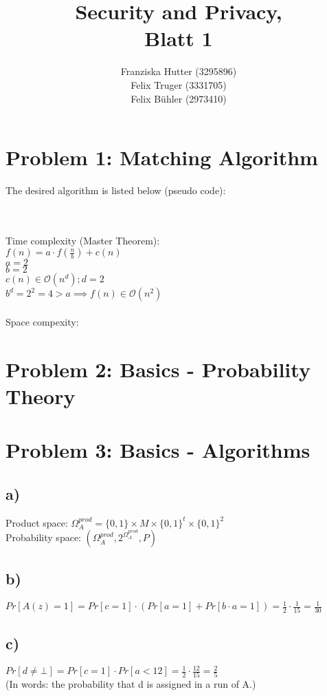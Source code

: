 \documentclass[12pt,pdftex,a4paper]{article}
\title{Security and Privacy,\\ Blatt 1}
\author{Franziska Hutter (3295896)\\
	Felix Truger (3331705)\\
	Felix Bühler (2973410)}
\newcommand\tab[1][1cm]{\hspace*{#1}}
\begin{document}
\maketitle
\pagebreak

\section*{Problem 1: Matching Algorithm}

The desired algorithm is listed below (pseudo code):

\ %
\\~\\
Time complexity (Master Theorem):\\ 
\tab $f(n) = a \cdot f(\frac{n}{b}) + c(n)$\\
\tab $a = 2$\\
\tab $b = 2$\\
\tab $c(n) \in \mathcal{O}(n^d); d = 2$\\
\tab $b^d = 2^2 = 4 > a \implies f(n) \in \mathcal{O}(n^2)$\\~\\

Space compexity:

\section*{Problem 2: Basics - Probability Theory}

\section*{Problem 3: Basics - Algorithms}

\subsection*{a)} 
Product space: $\Omega_A^{prod} = \{0, 1\} \times M \times \{0, 1\}^t \times \{0, 1\}^2$\\
Probability space: $(\Omega_A^{prod}, 2^{\Omega_A^{prod}}, P)$

\subsection*{b)}
$Pr[A(z) = 1] = Pr[c = 1] \cdot (Pr[a = 1] + Pr[b \cdot a = 1]) = \frac{1}{2} \cdot \frac{1}{15} = \frac{1}{30}$

\subsection*{c)}
$Pr[d \neq \bot] = Pr[c = 1] \cdot Pr[a < 12] = \frac{1}{2} \cdot \frac{12}{15} = \frac{2}{5}$\\
(In words: the probability that d is assigned in a run of A.)
\end{document}
